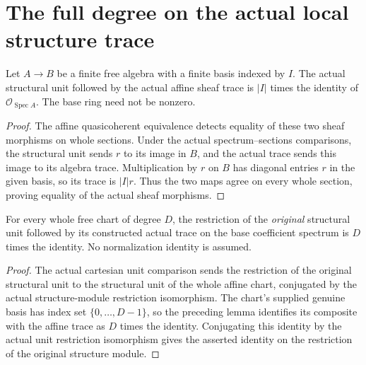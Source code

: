 \section{The full degree on the actual local structure trace}

\begin{lemma}
\label{lem:kn-structure-trace-affine-basis-unit}
\leanok
Let $A\to B$ be a finite free algebra with a finite basis indexed by $I$.
The actual structural unit followed by the actual affine sheaf trace is
$|I|$ times the identity of $\mathcal O_{\operatorname{Spec}A}$.
The base ring need not be nonzero.
\end{lemma}
\begin{proof}
The affine quasicoherent equivalence detects equality of these two sheaf
morphisms on whole sections. Under the actual spectrum--sections
comparisons, the structural unit sends $r$ to its image in $B$, and the
actual trace sends this image to its algebra trace. Multiplication by
$r$ on $B$ has diagonal entries $r$ in the given basis, so its trace is
$|I|r$. Thus the two maps agree on every whole section, proving equality
of the actual sheaf morphisms.
\end{proof}

\begin{lemma}
\label{lem:kn-structure-trace-local-spec-unit}
\leanok
For every whole free chart of degree $D$, the restriction of the
\emph{original} structural unit followed by its constructed actual
trace on the base coefficient spectrum is $D$ times the identity.
No normalization identity is assumed.
\end{lemma}
\begin{proof}
The actual cartesian unit comparison sends the restriction of the
original structural unit to the structural unit of the whole affine
chart, conjugated by the actual structure-module restriction
isomorphism. The chart's supplied genuine basis has index set
$\{0,\ldots,D-1\}$, so the preceding lemma identifies its composite with
the affine trace as $D$ times the identity. Conjugating this identity by
the actual unit restriction isomorphism gives the asserted identity on
the restriction of the original structure module.
\end{proof}
